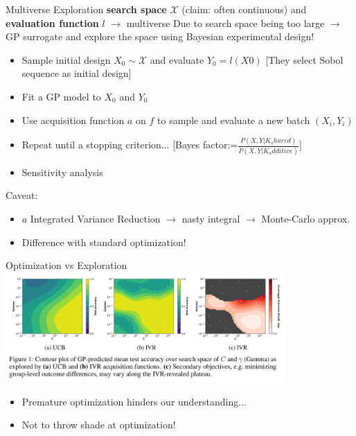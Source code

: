 \documentclass[aspectratio=169]{beamer}
\begin{document}
\begin{frame}{Multiverse Exploration}
  {
  \color{Pink} \textbf{search space} $\mathcal{X}$ (claim: often continuous) and \textbf{evaluation function} $l$ $\to$ multiverse 
  \color{Black} Due to search space being too large $\to$ GP surrogate and explore the space using Bayesian experimental design!
  }
  {
  \begin{itemize}
    \item Sample initial design $X_0\sim\mathcal{X}$ and evaluate $Y_0=l(X0)$ [They select Sobol sequence as initial design]
    \item Fit a GP model to $X_0$ and $Y_0$
    \item Use acquisition function $a$ on $f$ to sample and evaluate a new batch $(X_i,Y_i)$
    \item Repeat until a stopping criterion... [Bayes factor:=$\frac{P(X,Y|K_shared)}{P(X,Y|K_additive)}$]
    \item Sensitivity analysis
  \end{itemize}
  }
  {
  Caveat:
  \begin{itemize}
    \item $a$ Integrated Variance Reduction $\to$ nasty integral $\to$ Monte-Carlo approx.
    \item Difference with standard optimization!
  \end{itemize}
  }
\end{frame}

\begin{frame}{Optimization vs Exploration}
  \centering
  \includegraphics[width=0.8\textwidth]{figures/svm.png}
  \begin{itemize}
    \item Premature optimization hinders our understanding...
    \item Not to throw shade at optimization!
  \end{itemize}
\end{frame}
\end{document}
